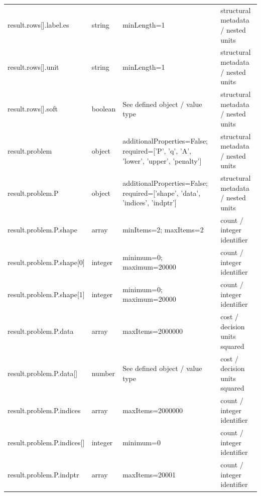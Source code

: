 \begin{longtable}{@{}>{\raggedright\arraybackslash}p{}>{\raggedright\arraybackslash}p{}>{\raggedright\arraybackslash}p{}>{\raggedright\arraybackslash}p{}@{}}
result.\allowbreak{}rows[].\allowbreak{}label.\allowbreak{}es & string & minLength=\allowbreak{}1 & structural metadata /\allowbreak{} nested units\\
result.\allowbreak{}rows[].\allowbreak{}unit & string & minLength=\allowbreak{}1 & structural metadata /\allowbreak{} nested units\\
result.\allowbreak{}rows[].\allowbreak{}soft & boolean & See defined object /\allowbreak{} value type & structural metadata /\allowbreak{} nested units\\
result.\allowbreak{}problem & object & additionalProperties=\allowbreak{}False; required=\allowbreak{}['P', 'q', 'A', 'lower', 'upper', 'penalty'] & structural metadata /\allowbreak{} nested units\\
result.\allowbreak{}problem.\allowbreak{}P & object & additionalProperties=\allowbreak{}False; required=\allowbreak{}['shape', 'data', 'indices', 'indptr'] & structural metadata /\allowbreak{} nested units\\
result.\allowbreak{}problem.\allowbreak{}P.\allowbreak{}shape & array & minItems=\allowbreak{}2; maxItems=\allowbreak{}2 & count /\allowbreak{} integer identifier\\
result.\allowbreak{}problem.\allowbreak{}P.\allowbreak{}shape[0] & integer & minimum=\allowbreak{}0; maximum=\allowbreak{}20000 & count /\allowbreak{} integer identifier\\
result.\allowbreak{}problem.\allowbreak{}P.\allowbreak{}shape[1] & integer & minimum=\allowbreak{}0; maximum=\allowbreak{}20000 & count /\allowbreak{} integer identifier\\
result.\allowbreak{}problem.\allowbreak{}P.\allowbreak{}data & array & maxItems=\allowbreak{}2000000 & cost /\allowbreak{} decision units squared\\
result.\allowbreak{}problem.\allowbreak{}P.\allowbreak{}data[] & number & See defined object /\allowbreak{} value type & cost /\allowbreak{} decision units squared\\
result.\allowbreak{}problem.\allowbreak{}P.\allowbreak{}indices & array & maxItems=\allowbreak{}2000000 & count /\allowbreak{} integer identifier\\
result.\allowbreak{}problem.\allowbreak{}P.\allowbreak{}indices[] & integer & minimum=\allowbreak{}0 & count /\allowbreak{} integer identifier\\
result.\allowbreak{}problem.\allowbreak{}P.\allowbreak{}indptr & array & maxItems=\allowbreak{}20001 & count /\allowbreak{} integer identifier\\

\end{longtable}
